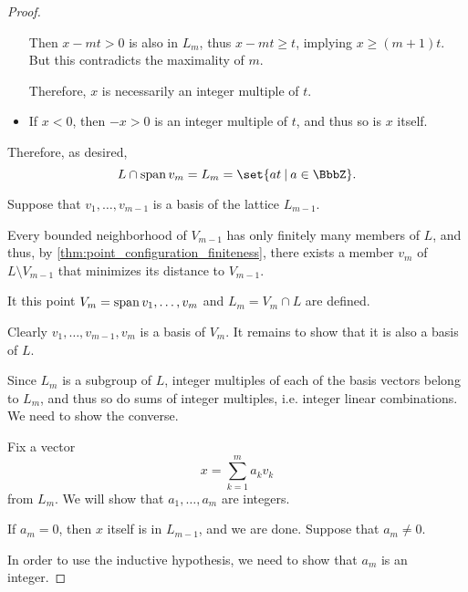 \begin{proof}
\begin{itemize}
    Then \( x - mt > 0 \) is also in \( L_m \), thus \( x - mt \geq t \), implying \( x \geq (m + 1)t \). But this contradicts the maximality of \( m \).

    Therefore, \( x \) is necessarily an integer multiple of \( t \).

    \item If \( x < 0 \), then \( -x > 0 \) is an integer multiple of \( t \), and thus so is \( x \) itself.
  \end{itemize}

  Therefore, as desired,
  \begin{equation*}
    L \cap \linspan{ v_m } = L_m = \set{ at \given a \in \BbbZ }.
  \end{equation*}

   Suppose that \( v_1, \ldots, v_{m-1} \) is a basis of the lattice \( L_{m-1} \).

  Every bounded neighborhood of \( V_{m-1} \) has only finitely many members of \( L \), and thus, by \cref{thm:point_configuration_finiteness}, there exists a member \( v_m \) of \( L \setminus V_{m-1} \) that minimizes its distance to \( V_{m-1} \).

  It this point \( V_m = \operatorname{span}{ v_1, \ldots, v_m } \) and \( L_m = V_m \cap L \) are defined.

  Clearly \( v_1, \ldots, v_{m-1}, v_m \) is a basis of \( V_m \). It remains to show that it is also a basis of \( L \).

  Since \( L_m \) is a subgroup of \( L \), integer multiples of each of the basis vectors belong to \( L_m \), and thus so do sums of integer multiples, i.e. integer linear combinations. We need to show the converse.

  Fix a vector
  \begin{equation*}
    x = \sum_{k=1}^m a_k v_k
  \end{equation*}
  from \( L_m \). We will show that \( a_1, \ldots, a_m \) are integers.

  If \( a_m = 0 \), then \( x \) itself is in \( L_{m-1} \), and we are done. Suppose that \( a_m \neq 0 \).

  In order to use the inductive hypothesis, we need to show that \( a_m \) is an integer.


\end{proof}
